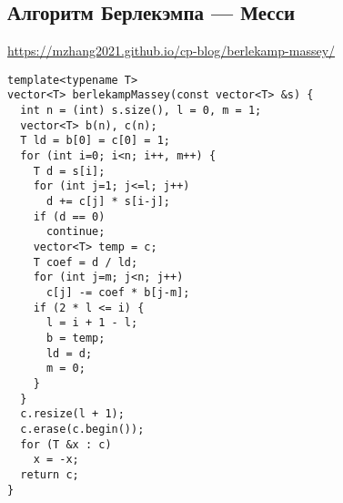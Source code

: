 \subsection{Алгоритм Берлекэмпа --- Месси}
\underline{\url{https://mzhang2021.github.io/cp-blog/berlekamp-massey/}}
\begin{lstlisting}
template<typename T>
vector<T> berlekampMassey(const vector<T> &s) {
  int n = (int) s.size(), l = 0, m = 1;
  vector<T> b(n), c(n);
  T ld = b[0] = c[0] = 1;
  for (int i=0; i<n; i++, m++) {
    T d = s[i];
    for (int j=1; j<=l; j++)
      d += c[j] * s[i-j];
    if (d == 0)
      continue;
    vector<T> temp = c;
    T coef = d / ld;
    for (int j=m; j<n; j++)
      c[j] -= coef * b[j-m];
    if (2 * l <= i) {
      l = i + 1 - l;
      b = temp;
      ld = d;
      m = 0;
    }
  }
  c.resize(l + 1);
  c.erase(c.begin());
  for (T &x : c)
    x = -x;
  return c;
}  
\end{lstlisting}